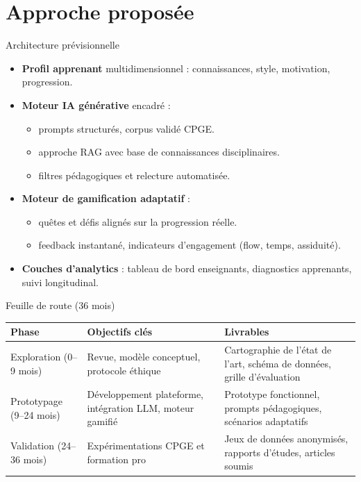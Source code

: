 \documentclass[aspectratio=169]{beamer}
\begin{document}
\section{Approche proposée}

\begin{frame}{Architecture prévisionnelle}
  \begin{itemize}
    \item \textbf{Profil apprenant} multidimensionnel : connaissances, style, motivation, progression.
    \item \textbf{Moteur IA générative} encadré :
          \begin{itemize}
             \item prompts structurés, corpus validé CPGE.
             \item approche RAG avec base de connaissances disciplinaires.
             \item filtres pédagogiques et relecture automatisée.
          \end{itemize}
    \item \textbf{Moteur de gamification adaptatif} :
          \begin{itemize}
            \item quêtes et défis alignés sur la progression réelle.
            \item feedback instantané, indicateurs d'engagement (flow, temps, assiduité).
          \end{itemize}
    \item \textbf{Couches d'analytics} : tableau de bord enseignants, diagnostics apprenants, suivi longitudinal.
  \end{itemize}
\end{frame}

\begin{frame}{Feuille de route (36 mois)}
  \begin{center}
    \begin{tabular}{@{}p{}p{}p{}@{}}
      \toprule
      Phase & Objectifs clés & Livrables \\
      \midrule
      Exploration (0--9 mois) & Revue, modèle conceptuel, protocole éthique & Cartographie de l'état de l'art, schéma de données, grille d'évaluation \\
      Prototypage (9--24 mois) & Développement plateforme, intégration LLM, moteur gamifié & Prototype fonctionnel, prompts pédagogiques, scénarios adaptatifs \\
      Validation (24--36 mois) & Expérimentations CPGE et formation pro & Jeux de données anonymisés, rapports d'études, articles soumis \\
      \bottomrule
    \end{tabular}
  \end{center}
\end{frame}
\end{document}
